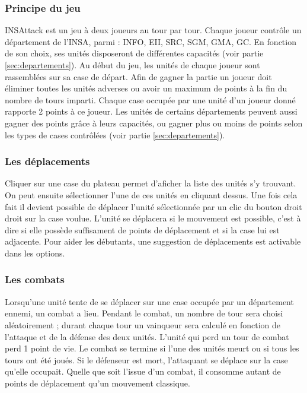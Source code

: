 \subsubsection{Principe du jeu}
INSAttack est un jeu à deux joueurs au tour par tour. Chaque joueur contrôle un département de l'INSA, parmi : INFO, EII, SRC, SGM, GMA, GC. En fonction de son choix, ses unités disposeront de différentes capacités (voir partie \ref{sec:departements}). Au début du jeu, les unités de chaque joueur sont rassemblées sur sa case de départ. Afin de gagner la partie un joueur doit éliminer toutes les unités adverses ou avoir un maximum de points à la fin du nombre de tours imparti. Chaque case occupée par une unité d'un joueur donné rapporte 2 points à ce joueur. Les unités de certains départements peuvent aussi gagner des points grâce à leurs capacités, ou gagner plus ou moins de points selon les types de cases contrôlées (voir partie \ref{sec:departements}).

\subsubsection{Les déplacements}
Cliquer sur une case du plateau permet d'aficher la liste des unités s'y trouvant. On peut ensuite sélectionner l'une de ces unités en cliquant dessus. Une fois cela fait il devient possible de déplacer l'unité sélectionnée par un clic du bouton droit droit sur la case voulue. L'unité se déplacera si le mouvement est possible, c'est à dire si elle possède suffisament de points de déplacement et si la case lui est adjacente.
Pour aider les débutants, une suggestion de déplacements est activable dans les options.

\subsubsection{Les combats}
Lorsqu'une unité tente de se déplacer sur une case occupée par un département ennemi, un combat a lieu. Pendant le combat, un nombre de tour sera choisi aléatoirement ; durant chaque tour un vainqueur sera calculé en fonction de l'attaque et de la défense des deux unités. L'unité qui perd un tour de combat perd 1 point de vie. Le combat se termine si l'une des unités meurt ou si tous les tours ont été joués. Si le défenseur est mort, l'attaquant se déplace sur la case qu'elle occupait. Quelle que soit l'issue d'un combat, il consomme autant de points de déplacement qu'un mouvement classique.